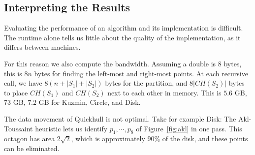 %
%
%
%
%
%
%

\subsection{Interpreting the Results}

Evaluating the performance of an algorithm and its implementation is difficult.
The runtime alone tells us little about the quality of the implementation, as
it differs between machines.

For this reason we also compute the bandwidth. Assuming a double is $8$ bytes,
this is $8n$ bytes for finding the left-most and right-most points. At each
recursive call, we have $8(n + |S_1| + |S_2|)$ bytes for the partition,
and $8|CH(S_2)|$ bytes to place $CH(S_1)$ and $CH(S_2)$ next to each other in
memory. This is $5.6$ GB, $73$ GB, $7.2$ GB for Kuzmin, Circle, and Disk.

The data movement of Quickhull is not optimal. Take for example Disk:
The Akl-Toussaint heuristic \cite{akl78} lets us identify $p_1, \cdots, p_8$
of Figure~\ref{fig:akl} in one pass. This octagon has area $2\sqrt{2}$,
which is approximately $90\%$ of the disk, and these points can be eliminated.

